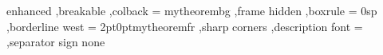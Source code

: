 {%
	enhanced
	,breakable
	,colback = mytheorembg
	,frame hidden
	,boxrule = 0sp
	,borderline west = {2pt}{0pt}{mytheoremfr}
	,sharp corners
	,description font = \mdseries
	,separator sign none
}
%
%
%
%
%
%
%
